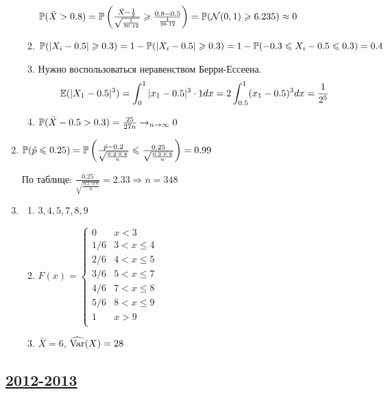 \begin{enumerate}
\begin{enumerate}
$\P(\bar{X}>0.8) = \P\left(\frac{\bar{X} - \frac{1}{2}}{\sqrt{ \frac{1}{36\cdot 12}}} \geq \frac{0.8-0.5}{ \frac{1}{36\cdot 12}} \right) = \P(\cN(0,1) \geq 6.235) \approx 0$
\item $ \P(|X_i-0.5|\geqslant 0.3) = 1 - \P(|X_i-0.5|\geqslant 0.3) = 1 - \P(-0.3 \leqslant X_i - 0.5 \leqslant 0.3) = 0.4$
\item Нужно воспользоваться неравенством Берри-Ессеена.
\[
\E(|X_1 - 0.5|^3) = \int_0^1 |x_1 -0.5|^3 \cdot 1 dx = 2 \int_{0.5}^1 (x_1 - 0.5)^3 dx = \frac{1}{2^5}
\]
\item $\P(\bar{X} - 0.5 > 0.3) = \frac{25}{27n} \to_{n \to \infty} 0$
\end{enumerate}
\item $\P(\hat{p} \leq 0.25) = \P\left(\frac{\hat{p} - 0.2}{\sqrt{\frac{0.2\cdot0.8}{n}}} \leq \frac{0.25}{\sqrt{\frac{0.2\cdot0.8}{n}}}\right) = 0.99$

По таблице: $\frac{0.25}{\sqrt{\frac{0.2\cdot0.8}{n}}} = 2.33 \Rightarrow n = 348$
\item
\begin{enumerate}
\item $3, 4, 5, 7, 8, 9$
\item $F(x) = \begin{cases}
0 &  x < 3 \\
1/6 & 3 < x \leq 4 \\
2/6 & 4 < x \leq 5 \\
3/6 & 5 < x \leq 7 \\
4/6 & 7 < x \leq 8 \\
5/6 & 8 < x \leq 9 \\
1 &  x > 9 \\
\end{cases}$
\item $\bar{X} = 6$, $\widehat{\Var}(X) = 28$
\end{enumerate}
\end{enumerate}




\subsection[2012-2013]{\hyperref[sec:kr_02_2012_2013]{2012-2013}}
\label{sec:sol_kr_02_2012_2013}


